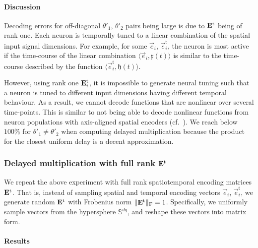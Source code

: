\paragraph{Discussion}
Decoding errors for off-diagonal $\theta'_1$, $\theta'_2$ pairs being large is due to $\mathbf{E}^\mathrm{t}$ being of rank one.
Each neuron is temporally tuned to a linear combination of the spatial input signal dimensions.
For example, for some $\vec e_i$, $\vec e_i^\mathrm{t}$, the neuron is most active if the time-course of the linear combination $\langle \vec e_i, \mathfrak{x}(t) \rangle$ is similar to the time-course described by the function $\langle \vec e_i^\mathrm{t}, \mathfrak{h}(t) \rangle$.

However, using rank one $\mathbf{E}_i^\mathrm{t}$, it is impossible to generate neural tuning such that a neuron is tuned to different input dimensions having different temporal behaviour.
As a result, we cannot decode functions that are nonlinear over several time-points.
This is similar to not being able to decode nonlinear functions from neuron populations with axis-aligned spatial encoders (cf.~).
We reach \NRMSEpl below $100\%$ for $\theta'_1 \neq \theta'_2$ when computing delayed multiplication because the product for the closest uniform delay is a decent approximation.


\subsubsection{Delayed multiplication with full rank $\mathbf{E}^\mathrm{t}$}

We repeat the above experiment with full rank spatiotemporal encoding matrices $\mathbf{E}^\mathrm{t}$.
That is, instead of sampling spatial and temporal encoding vectors $\vec e_i$, $\vec e^\mathrm{t}_i$, we generate random $\mathbf{E}^\mathrm{t}$ with Frobenius norm $\| \mathbf{E}^\mathrm{t} \|_\mathrm{F} = 1$.
Specifically, we uniformly sample vectors from the hypersphere $\mathbb{S}^{dq}$, and reshape these vectors into matrix form.

\paragraph{Results}

